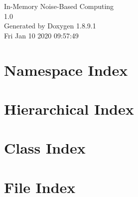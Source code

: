 \documentclass[twoside]{book}
\newcommand{\+}{\discretionary{\mbox{\scriptsize$\hookleftarrow$}}{}{}}
\newcommand{\clearemptydoublepage}{%
  \newpage{\pagestyle{empty}\cleardoublepage}%
}
\begin{document}
\hypersetup{pageanchor=false,
             bookmarks=true,
             bookmarksnumbered=true,
             pdfencoding=unicode
            }
\begin{titlepage}
\vspace*{7cm}
\begin{center}%
{\Large In-\/\+Memory Noise-\/\+Based Computing \\[1ex]\large 1.\+0 }\\
\vspace*{1cm}
{\large Generated by Doxygen 1.8.9.1}\\
\vspace*{0.5cm}
{\small Fri Jan 10 2020 09:57:49}\\
\end{center}
\end{titlepage}
\clearemptydoublepage
\tableofcontents
\clearemptydoublepage
{}
\hypersetup{pageanchor=true}

\chapter{Namespace Index}

\chapter{Hierarchical Index}

\chapter{Class Index}

\chapter{File Index}

\end{document}
